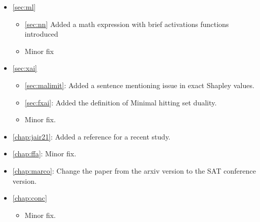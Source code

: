 \begin{itemize}
	\item \autoref{sec:ml}
		\begin{itemize}
			\item \autoref{sec:nn} Added a math expression with brief activations
				functions introduced
			\item Minor fix
		\end{itemize}
	\item \autoref{sec:xai}
		\begin{itemize}
			\item \autoref{sec:malimit}: Added a sentence mentioning issue in exact
				Shapley values.
			\item \autoref{sec:fxai}: Added the definition of Minimal hitting set
				duality.
			\item Minor fix.
		\end{itemize}
	\item \autoref{chap:jair21}: Added a reference for a recent study.
	\item \autoref{chap:ffa}: Minor fix.
	\item \autoref{chap:marco}: Change the paper from the arxiv version to the SAT conference
		version.
	\item \autoref{chap:conc}
		\begin{itemize}
			\item Minor fix.
		\end{itemize}
	
\end{itemize}
\color{black}
